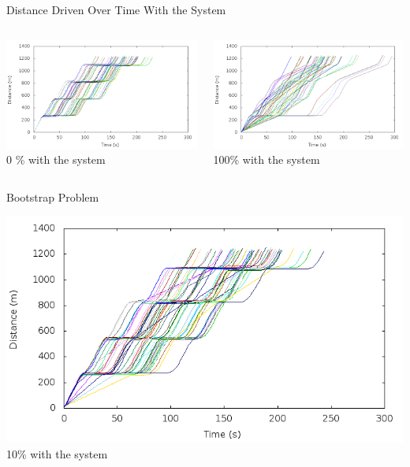 	
\begin{frame}{Distance Driven Over Time With the System}
\begin{columns}
	\begin{column}{0.4\textwidth}
	\includegraphics[width=1\textwidth]{images/tp0/distance0.png}\\
	0 \% with the system
	\end{column}
	\begin{column}{0.6\textwidth}
	\includegraphics[width=1\textwidth]{images/tp0/distance100.png}\\
	100\% with the system
	\end{column}
\end{columns}
\end{frame}


\begin{frame}{Bootstrap Problem}

\includegraphics[width=1\textwidth]{images/tp0/distance10.png}\\
10\% with the system
\end{frame}


